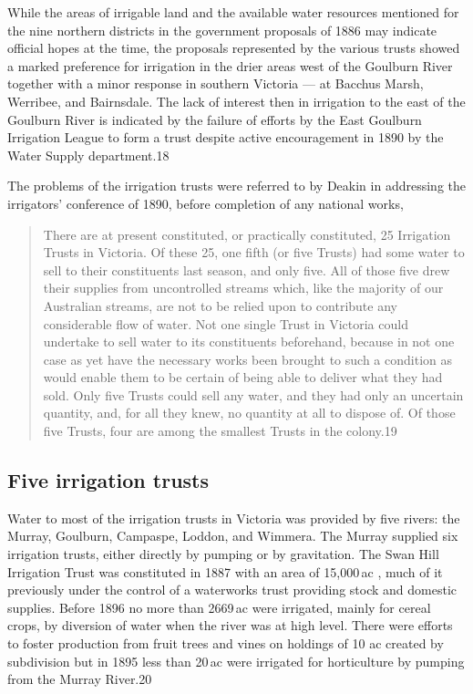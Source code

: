 While the areas of irrigable land and the available water resources
mentioned for the nine northern districts in the government proposals
of 1886 may indicate official hopes at the time, the proposals
represented by the various trusts showed a marked preference for
irrigation in the drier areas west of the Goulburn River together with
a minor response in southern Victoria --- at Bacchus Marsh, Werribee,
and Bairnsdale. The lack of interest then in irrigation to the east of
the Goulburn River is indicated by the failure of efforts by the East
Goulburn Irrigation League to form a trust despite active
encouragement in 1890 by the Water Supply department.18

The problems of the irrigation trusts were referred to by Deakin in
addressing the irrigators' conference of 1890, before completion of
any national works,
\begin{quote}
	There are at present constituted, or practically constituted,
	25 Irrigation Trusts in Victoria. Of these 25, one fifth (or
	five Trusts) had some water to sell to their constituents last
	season, and only five.  All of those five drew their supplies
	from uncontrolled streams which, like the majority of our
	Australian streams, are not to be relied upon to contribute
	any considerable flow of water. Not one single Trust in
	Victoria could undertake to sell water to its constituents
	beforehand, because in not one case as yet have the necessary
	works been brought to such a condition as would enable them to
	be certain of being able to deliver what they had sold. Only
	five Trusts could sell any water, and they had only an
	uncertain quantity, and, for all they knew, no quantity at all
	to dispose of. Of those five Trusts, four are among the
	smallest Trusts in the colony.19
\end{quote}

\subsection{Five irrigation trusts}

Water to most of the irrigation trusts in Victoria was provided by
five rivers: the Murray, Goulburn, Campaspe, Loddon, and Wimmera. The
Murray supplied six irrigation trusts, either directly by pumping or
by gravitation. The Swan Hill Irrigation Trust was constituted in 1887
with an area of 15,000\,ac , much of it previously under the control
of a waterworks trust providing stock and domestic supplies. Before
1896 no more than 2669\,ac were irrigated, mainly for cereal crops, by
diversion of water when the river was at high level. There were
efforts to foster production from fruit trees and vines on holdings of
10 ac created by subdivision but in 1895 less than 20\,ac were
irrigated for horticulture by pumping from the Murray River.20

